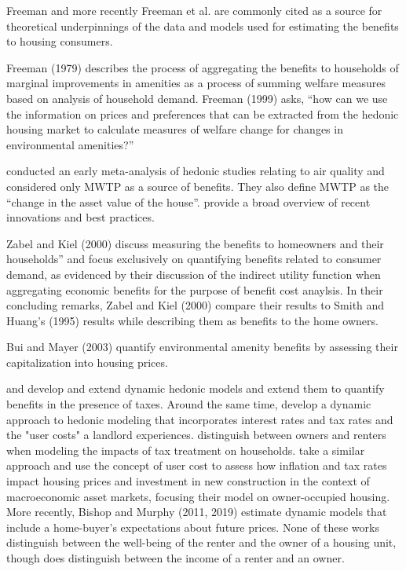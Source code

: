 \documentclass[ecta,nameyear,draft]{econsocart}
\theoremstyle{plain}
\theoremstyle{remark}
\begin{document}
Freeman and more recently Freeman et al. are commonly cited as a source for theoretical underpinnings of the data and models used for estimating the benefits to housing consumers.  

Freeman (1979) describes the process of aggregating the benefits to households of marginal improvements in amenities as a process of summing welfare measures based on analysis of household demand. Freeman (1999) asks, “how can we use the information on prices and preferences that can be extracted from the hedonic housing market to calculate  measures of welfare change for changes in environmental amenities?” 



\cite{smithhuang95} conducted an early meta-analysis of hedonic studies relating to air quality and considered only MWTP as a source of benefits. They also define MWTP as the “change in the asset value of the house”. 
\cite{bishop20} provide a broad overview of recent innovations and best practices.

Zabel and Kiel (2000) discuss measuring the benefits to homeowners and their households” and focus exclusively on quantifying benefits related to consumer demand, as evidenced by their discussion of the indirect utility function when aggregating economic benefits for the purpose of benefit cost anaylsis. In their concluding remarks, Zabel and Kiel (2000) compare their results to Smith and Huang’s (1995) results while describing them as benefits to the home owners. 

Bui and Mayer (2003) quantify environmental amenity benefits by assessing their capitalization into housing prices. 

\cite{niskanen77} and \cite{freeman80} develop and extend dynamic hedonic models and extend them to quantify benefits in the presence of taxes. Around the same time, \cite{sonstelie80} develop a dynamic approach to hedonic modeling that incorporates interest rates and tax rates and the "user costs" a landlord experiences. \cite{hendershott83} distinguish between owners and renters when modeling the impacts of tax treatment on households. \cite{poterba84} take a similar approach and use the concept of user cost to assess how inflation and tax rates impact housing prices and investment in new construction in the context of macroeconomic asset markets, focusing their model on owner-occupied housing. More recently, Bishop and Murphy (2011, 2019) estimate dynamic models that include a home-buyer's expectations about future prices. None of these works distinguish between the well-being of the renter and the owner of a housing unit, though \cite{hendershott83} does distinguish between the income of a renter and an owner.
\end{document}
